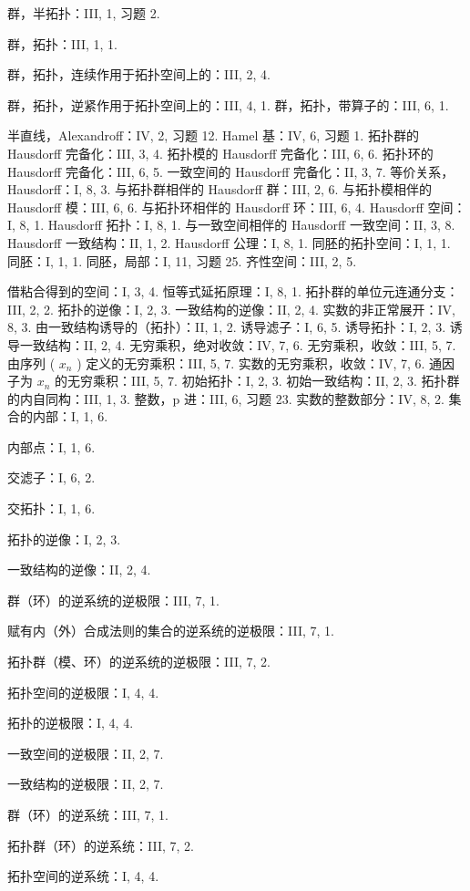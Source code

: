 群，半拓扑：III, 1, 习题 2.

群，拓扑：III, 1, 1.

群，拓扑，连续作用于拓扑空间上的：III, 2, 4.

群，拓扑，逆紧作用于拓扑空间上的：III, 4, 1. 群，拓扑，带算子的：III, 6, 1.

半直线，Alexandroff：IV, 2, 习题 12. Hamel 基：IV, 6, 习题 1. 拓扑群的 Hausdorff 完备化：III, 3, 4. 拓扑模的 Hausdorff 完备化：III, 6, 6. 拓扑环的 Hausdorff 完备化：III, 6, 5. 一致空间的 Hausdorff 完备化：II, 3, 7. 等价关系，Hausdorff：I, 8, 3. 与拓扑群相伴的 Hausdorff 群：III, 2, 6. 与拓扑模相伴的 Hausdorff 模：III, 6, 6. 与拓扑环相伴的 Hausdorff 环：III, 6, 4. Hausdorff 空间：I, 8, 1. Hausdorff 拓扑：I, 8, 1. 与一致空间相伴的 Hausdorff 一致空间：II, 3, 8. Hausdorff 一致结构：II, 1, 2. Hausdorff 公理：I, 8, 1. 同胚的拓扑空间：I, 1, 1. 同胚：I, 1, 1. 同胚，局部：I, 11, 习题 25. 齐性空间：III, 2, 5.

借粘合得到的空间：I, 3, 4. 恒等式延拓原理：I, 8, 1. 拓扑群的单位元连通分支：III, 2, 2. 拓扑的逆像：I, 2, 3. 一致结构的逆像：II, 2, 4. 实数的非正常展开：IV, 8, 3. 由一致结构诱导的（拓扑）：II, 1, 2. 诱导滤子：I, 6, 5. 诱导拓扑：I, 2, 3. 诱导一致结构：II, 2, 4. 无穷乘积，绝对收敛：IV, 7, 6. 无穷乘积，收敛：III, 5, 7. 由序列 ( \(x_n\) ) 定义的无穷乘积：III, 5, 7. 实数的无穷乘积，收敛：IV, 7, 6. 通因子为 \(x_n\) 的无穷乘积：III, 5, 7. 初始拓扑：I, 2, 3. 初始一致结构：II, 2, 3. 拓扑群的内自同构：III, 1, 3. 整数，p 进：III, 6, 习题 23. 实数的整数部分：IV, 8, 2. 集合的内部：I, 1, 6.

内部点：I, 1, 6.

交滤子：I, 6, 2.

交拓扑：I, 1, 6.

拓扑的逆像：I, 2, 3.

一致结构的逆像：II, 2, 4.

群（环）的逆系统的逆极限：III, 7, 1.

赋有内（外）合成法则的集合的逆系统的逆极限：III, 7, 1.

拓扑群（模、环）的逆系统的逆极限：III, 7, 2.

拓扑空间的逆极限：I, 4, 4.

拓扑的逆极限：I, 4, 4.

一致空间的逆极限：II, 2, 7.

一致结构的逆极限：II, 2, 7.

群（环）的逆系统：III, 7, 1.

拓扑群（环）的逆系统：III, 7, 2.

拓扑空间的逆系统：I, 4, 4.

